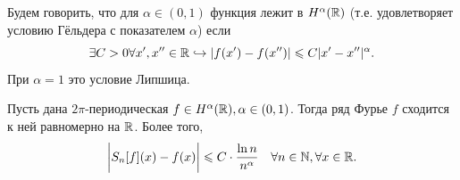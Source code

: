 \begin{definition}
    Будем говорить, что для $\alpha \in (0, 1)$ функция лежит в $H^\alpha(\mathbb{R})$ (т.е. удовлетворяет условию Гёльдера с показателем $\alpha$) если \[
                                                                                                                                                     \exists C > 0 \forall x', x'' \in \mathbb{R} \hookrightarrow |f(x') - f(x'')| \leqslant C|x' - x''|^\alpha.
    \]
    При $\alpha = 1$ это условие Липшица.
\end{definition}
\begin{theorem}
    Пусть дана $2\pi$-периодическая $f \in H^\alpha(\mathbb{R}), \alpha \in (0, 1)$. Тогда ряд Фурье $f$ сходится к ней равномерно на $\mathbb{R}$. Более того, \[
                                                                                                                                                    \biggr|S_n[f](x) - f(x)\biggr| \leqslant C \cdot \dfrac{\ln n}{n^\alpha} \quad \forall n \in \mathbb{N}, \forall x \in \mathbb{R}.
    \]
\end{theorem}
